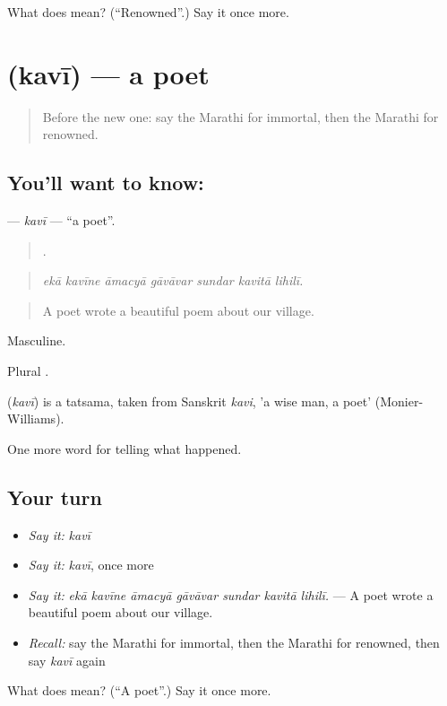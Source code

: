 \begin{tcolorbox}[breakable,colback=teal!4,colframe=teal!35!black,title={Before you move on}]
What does  mean? (\textquotedblleft{}Renowned\textquotedblright{}.) Say it once more.
\end{tcolorbox}
\section[\texorpdfstring{\mr{कवी} (kavī)}{कवी (kavī)}]{ (kavī) — a poet}

\label{lesson:MR-C337-kavi}



\begin{quote}
Before the new one: say the Marathi for immortal, then the Marathi for renowned.
\end{quote}

\subsection*{You'll want to know: }
\textbf{} — \emph{kavī} — \textquotedblleft{}a poet\textquotedblright{}.

\begin{quote}
      .
\end{quote}

\begin{quote}
\emph{ekā kavīne āmacyā gāvāvar sundar kavitā lihilī.}
\end{quote}

\begin{quote}
A poet wrote a beautiful poem about our village.
\end{quote}

Masculine.

Plural .

\begin{cousinweb}
\textbf{} (\emph{kavī}) is a tatsama, taken from Sanskrit \emph{kavi}, 'a wise man, a poet' (Monier-Williams).
\end{cousinweb}

\begin{grammarlens}[title={What you've built}]
One more word for telling what happened.
\end{grammarlens}

\subsection*{Your turn}
\begin{itemize}
\raggedright
  \item \emph{Say it:} \emph{kavī}
  \item \emph{Say it:} \emph{kavī}, once more
  \item \emph{Say it:} \emph{ekā kavīne āmacyā gāvāvar sundar kavitā lihilī.} — A poet wrote a beautiful poem about our village.
  \item \emph{Recall:} say the Marathi for immortal, then the Marathi for renowned, then say \emph{kavī} again
\end{itemize}

\begin{tcolorbox}[breakable,colback=teal!4,colframe=teal!35!black,title={Before you move on}]
What does  mean? (\textquotedblleft{}A poet\textquotedblright{}.) Say it once more.
\end{tcolorbox}
